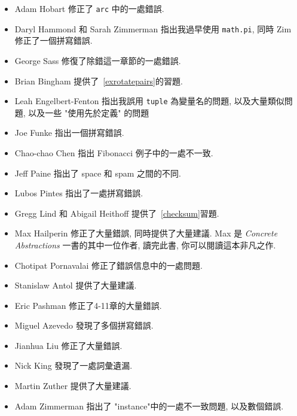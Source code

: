 \documentclass[10pt]{book}
\begin{document}
\begin{itemize}
\item Adam Hobart 修正了 {\tt arc} 中的一處錯誤. 

\item Daryl Hammond 和 Sarah Zimmerman 指出我過早使用 {\tt math.pi}, 
同時 Zim 修正了一個拼寫錯誤. 

\item George Sass 修復了除錯這一章節的一處錯誤. 

\item Brian Bingham 提供了~\ref{exrotatepairs}的習題. 

\item Leah Engelbert-Fenton 指出我誤用 {\tt tuple} 為變量名的問題, 
以及大量類似問題, 以及一些 "使用先於定義" 的問題

\item Joe Funke 指出一個拼寫錯誤. 

\item Chao-chao Chen 指出 Fibonacci 例子中的一處不一致. 

\item Jeff Paine 指出了 space 和 spam 之間的不同. 

\item Lubos Pintes 指出了一處拼寫錯誤. 

\item Gregg Lind 和 Abigail Heithoff 提供了~\ref{checksum}習題. 

\item Max Hailperin 修正了大量錯誤, 同時提供了大量建議. 
Max 是 {\em Concrete Abstractions} 一書的其中一位作者, 讀完此書, 
你可以閱讀這本非凡之作. 

\item Chotipat Pornavalai 修正了錯誤信息中的一處問題. 

\item Stanislaw Antol 提供了大量建議. 

\item Eric Pashman 修正了4-11章的大量錯誤. 

\item Miguel Azevedo 發現了多個拼寫錯誤. 

\item Jianhua Liu 修正了大量錯誤. 

\item Nick King 發現了一處詞彙遺漏. 

\item Martin Zuther 提供了大量建議. 

\item Adam Zimmerman 指出了 "instance"中的一處不一致問題, 以及數個錯誤. 


\end{itemize}
\end{document}
